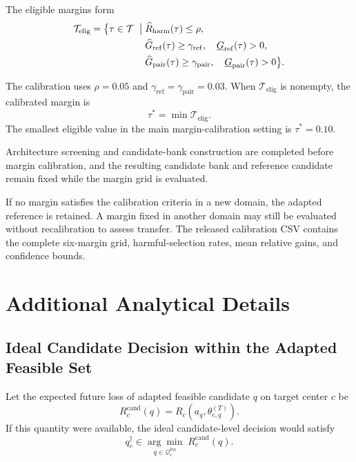 \documentclass[11pt,a4paper]{article}
\begin{document}
The eligible margins form
\begin{equation}
\begin{aligned}
\mathcal{T}_{\mathrm{elig}}
=
\bigl\{
\tau\in\mathcal{T}
\;\bigm|\;&
\widehat R_{\mathrm{harm}}(\tau)\leq\rho,
\\
&
\widehat G_{\mathrm{ref}}(\tau)\geq\gamma_{\mathrm{ref}},
\quad
\underline G_{\mathrm{ref}}(\tau)>0,
\\
&
\widehat G_{\mathrm{pair}}(\tau)\geq\gamma_{\mathrm{pair}},
\quad
\underline G_{\mathrm{pair}}(\tau)>0
\bigr\}.
\end{aligned}
\label{eq:supp-margin-calibration}
\end{equation}

The calibration uses
$\rho=0.05$ and
$\gamma_{\mathrm{ref}}=\gamma_{\mathrm{pair}}=0.03$.
When $\mathcal{T}_{\mathrm{elig}}$ is nonempty, the calibrated margin is
\begin{equation}
\tau^{*}=\min \mathcal{T}_{\mathrm{elig}}.
\end{equation}
The smallest eligible value in the main margin-calibration setting is
$\tau^{*}=0.10$.

Architecture screening and candidate-bank construction are completed before
margin calibration, and the resulting candidate bank and reference candidate
remain fixed while the margin grid is evaluated.

If no margin satisfies the calibration criteria in a new domain, the adapted
reference is retained. A margin fixed in another domain may still be
evaluated without recalibration to assess transfer. The released calibration
CSV contains the complete six-margin grid,
harmful-selection rates, mean relative gains, and confidence bounds.

\section{Additional Analytical Details}
\label{supp:analysis}

\subsection{Ideal Candidate Decision within the Adapted Feasible Set}

Let the expected future loss of adapted feasible candidate $q$ on target
center $c$ be
\begin{equation}
R_c^{\mathrm{cand}}(q)
=
R_c\left(a_q,\theta_{c,q}^{(T)}\right).
\label{eq:supp-candidate-risk}
\end{equation}
If this quantity were available, the ideal candidate-level decision would
satisfy
\begin{equation}
q_c^{\dagger}
\in
\underset{q\in\mathcal{Q}_{c}^{\mathrm{fea}}}
{\arg\min}\;
R_c^{\mathrm{cand}}(q).
\label{eq:supp-ideal-target}
\end{equation}
\end{document}
